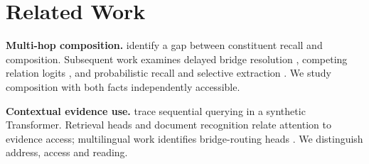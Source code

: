 \section{Related Work}\label{sec:related}
\textbf{Multi-hop composition.} \citet{press2023compositionality} identify a gap between constituent recall and composition. Subsequent work examines delayed bridge resolution \citep{biran2024hopping}, competing relation logits \citep{yu2025back}, and probabilistic recall and selective extraction \citep{liu2026layerorder}. We study composition with both facts independently accessible.

\textbf{Contextual evidence use.} \citet{guo2025twohop} trace sequential querying in a synthetic Transformer. Retrieval heads \citep{wu2025retrieval} and document recognition \citep{zhang2026failure} relate attention to evidence access; multilingual work identifies bridge-routing heads \citep{kim2026bridge}. We distinguish address, access and reading.
